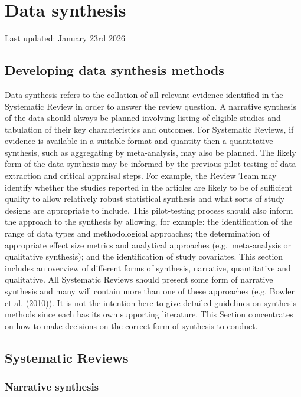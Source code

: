\documentclass[
  letterpaper,
  DIV=11,
  numbers=noendperiod]{scrreprt}
\begin{document}
\chapter{Data synthesis}\label{sec-chapt8}

Last updated: January 23rd 2026

\section{Developing data synthesis
methods}\label{developing-data-synthesis-methods}

Data synthesis refers to the collation of all relevant evidence
identified in the Systematic Review in order to answer the review
question. A narrative synthesis of the data should always be planned
involving listing of eligible studies and tabulation of their key
characteristics and outcomes. For Systematic Reviews, if evidence is
available in a suitable format and quantity then a quantitative
synthesis, such as aggregating by meta-analysis, may also be planned.
The likely form of the data synthesis may be informed by the previous
pilot-testing of data extraction and critical appraisal steps. For
example, the Review Team may identify whether the studies reported in
the articles are likely to be of sufficient quality to allow relatively
robust statistical synthesis and what sorts of study designs are
appropriate to include. This pilot-testing process should also inform
the approach to the synthesis by allowing, for example: the
identification of the range of data types and methodological approaches;
the determination of appropriate effect size metrics and analytical
approaches (e.g.~meta-analysis or qualitative synthesis); and the
identification of study covariates. This section includes an overview of
different forms of synthesis, narrative, quantitative and qualitative.
All Systematic Reviews should present some form of narrative synthesis
and many will contain more than one of these approaches (e.g. Bowler et
al. (2010)). It is not the intention here to give detailed guidelines on
synthesis methods since each has its own supporting literature. This
Section concentrates on how to make decisions on the correct form of
synthesis to conduct.

\section{Systematic Reviews}\label{systematic-reviews}

\subsection{Narrative synthesis}\label{narrative-synthesis}
\end{document}
